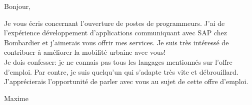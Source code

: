 \documentclass[12pt,french]{letter}
\begin{document}

\begin{letter}{}
\address{Montréal, Canada}

\opening{Bonjour,}


Je vous écris concernant l'ouverture de postes de programmeurs. 
J'ai de l'expérience développement d'applications communiquant avec SAP chez Bombardier et j'aimerais vous offrir mes services.
Je suis très intéressé de contribuer à améliorer la mobilité urbaine avec vous! \\ Je dois confesser: je ne connais pas tous les langages mentionnés sur l'offre d'emploi. Par contre, je suis quelqu'un qui s'adapte très vite et débrouillard. \\
J'apprécierais l'opportunité de parler avec vous au sujet de cette offre d'emploi.

\closing{Maxime}


\end{letter}
\end{document}
